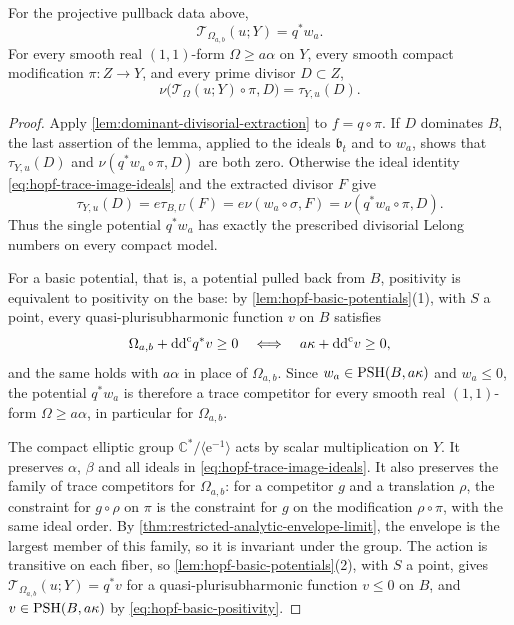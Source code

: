 \begin{theorem}\label{thm:hopf-projective-exact-trace}
For the projective pullback data above,
\begin{equation}\label{eq:hopf-projective-trace-envelope}
 \mathcal T_{\Omega_{a,b}}(u;Y)=q^*w_a.
\end{equation}
For every smooth real $(1,1)$-form $\Omega\geq a\alpha$ on $Y$, every smooth compact modification $\pi\colon Z\to Y$, and every prime divisor $D\subset Z$,
\[
 \nu\bigl(\mathcal T_\Omega(u;Y)\circ\pi,D\bigr)=\tau_{Y,u}(D).
\]
\end{theorem}
\begin{proof}
Apply \cref{lem:dominant-divisorial-extraction} to $f=q\circ\pi$. If $D$ dominates $B$, the last assertion of the lemma, applied to the ideals $\mathfrak b_t$ and to $w_a$, shows that $\tau_{Y,u}(D)$ and $\nu(q^*w_a\circ\pi,D)$ are both zero. Otherwise the ideal identity \eqref{eq:hopf-trace-image-ideals} and the extracted divisor $F$ give
\[
 \tau_{Y,u}(D)=e\tau_{B,U}(F)
             =e\nu(w_a\circ\sigma,F)
             =\nu(q^*w_a\circ\pi,D).
\]
Thus the single potential $q^*w_a$ has exactly the prescribed divisorial Lelong numbers on every compact model.

For a basic potential, that is, a potential pulled back from $B$, positivity is equivalent to positivity on the base: by \cref{lem:hopf-basic-potentials}(1), with $S$ a point, every quasi-plurisubharmonic function $v$ on $B$ satisfies
\begin{equation}\label{eq:hopf-basic-positivity}
 \Omega_{a,b}+\mathrm{dd}^{\mathrm{c}} q^*v\geq0
 \quad\Longleftrightarrow\quad a\kappa+\mathrm{dd}^{\mathrm{c}} v\geq0,
\end{equation}
and the same holds with $a\alpha$ in place of $\Omega_{a,b}$. Since $w_a\in\mathrm{PSH}(B,a\kappa)$ and $w_a\leq0$, the potential $q^*w_a$ is therefore a trace competitor for every smooth real $(1,1)$-form $\Omega\geq a\alpha$, in particular for $\Omega_{a,b}$.

The compact elliptic group $\mathbb C^*/\langle\mathrm e^{-1}\rangle$ acts by scalar multiplication on $Y$. It preserves $\alpha$, $\beta$ and all ideals in \eqref{eq:hopf-trace-image-ideals}. It also preserves the family of trace competitors for $\Omega_{a,b}$: for a competitor $g$ and a translation $\rho$, the constraint for $g\circ\rho$ on $\pi$ is the constraint for $g$ on the modification $\rho\circ\pi$, with the same ideal order. By \cref{thm:restricted-analytic-envelope-limit}, the envelope is the largest member of this family, so it is invariant under the group. The action is transitive on each fiber, so \cref{lem:hopf-basic-potentials}(2), with $S$ a point, gives $\mathcal T_{\Omega_{a,b}}(u;Y)=q^*v$ for a quasi-plurisubharmonic function $v\leq0$ on $B$, and $v\in\mathrm{PSH}(B,a\kappa)$ by \eqref{eq:hopf-basic-positivity}.


\end{proof}
